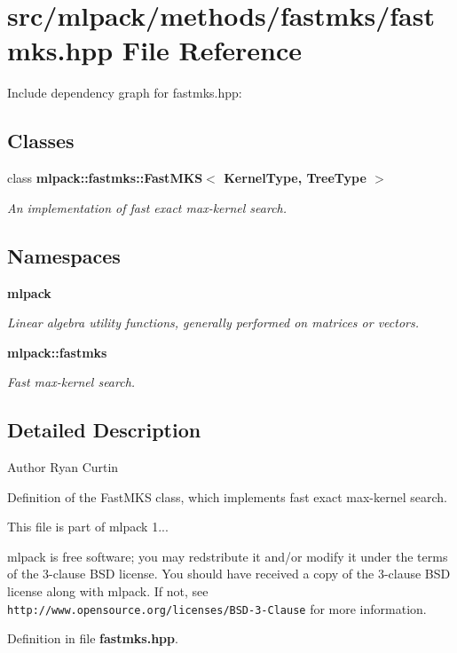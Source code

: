 \section{src/mlpack/methods/fastmks/fastmks.hpp File Reference}
\label{fastmks_8hpp}
Include dependency graph for fastmks.\-hpp\-:
\subsection*{Classes}
\begin{DoxyCompactItemize}
\item 
class {\bf mlpack\-::fastmks\-::\-Fast\-M\-K\-S$<$ Kernel\-Type, Tree\-Type $>$}
\begin{DoxyCompactList}\small\item\em An implementation of fast exact max-\/kernel search. \end{DoxyCompactList}\end{DoxyCompactItemize}
\subsection*{Namespaces}
\begin{DoxyCompactItemize}
\item 
{\bf mlpack}
\begin{DoxyCompactList}\small\item\em Linear algebra utility functions, generally performed on matrices or vectors. \end{DoxyCompactList}\item 
{\bf mlpack\-::fastmks}
\begin{DoxyCompactList}\small\item\em Fast max-\/kernel search. \end{DoxyCompactList}\end{DoxyCompactItemize}


\subsection{Detailed Description}
\begin{DoxyAuthor}{Author}
Ryan Curtin
\end{DoxyAuthor}
Definition of the Fast\-M\-K\-S class, which implements fast exact max-\/kernel search.

This file is part of mlpack 1...

mlpack is free software; you may redstribute it and/or modify it under the terms of the 3-\/clause B\-S\-D license. You should have received a copy of the 3-\/clause B\-S\-D license along with mlpack. If not, see {\tt http\-://www.\-opensource.\-org/licenses/\-B\-S\-D-\/3-\/\-Clause} for more information. 

Definition in file {\bf fastmks.\-hpp}.

